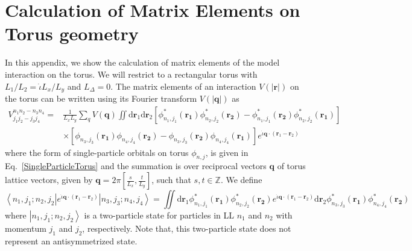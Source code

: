 \documentclass[prb,aps,epsfig,longbibliography,twocolumn]{revtex4-1}
\newcommand{\ket}[1]{\left|#1\right\rangle }
\newcommand{\bra}[1]{\left\langle #1\right|}
\newcommand{\bsym}[1]{\boldsymbol{#1}}
\newcommand{\sbkt}[1]{\left[ #1\right]}
\newcommand{\iiota}{\dot{\iota}}
\begin{document}
\section{Calculation of Matrix Elements on Torus geometry} \label{AppToruMatEle}
In this appendix, we show the calculation of matrix elements of the model interaction on the torus. We will restrict to a rectangular torus with $L_1/L_2=\iiota L_x/L_y$ and $L_\Delta=0$.  The matrix elements of an interaction $V(|\bsym{r}|)$ on the torus can be written using its Fourier transform $V(|\bsym{q}|)$  as \begin{align}
V^{n_1 n_2- n_3 n_4}_{j_1 j_2 - j_3 j_4}=&\frac{1}{L_x L_y} \sum_{{q}} V(\bsym{q}) \iint\text{d}\bsym{r}_1 \text{d}\bsym{r}_2 \sbkt{ \phi_{n_1,j_1}^{*}(\bsym{r_1}) \phi_{n_2,j_2}^{*}(\bsym{r_2})-\phi_{n_1,j_1}^{*}(\bsym{r_2}) \phi_{n_2,j_2}^{*}(\bsym{r_1})} \nonumber \\
& \times \sbkt{ \phi_{n_3,j_3}(\bsym{r_1}) \phi_{n_4,j_4}(\bsym{r_2})-  \phi_{n_3,j_3}(\bsym{r_2}) \phi_{n_4,j_4}(\bsym{r_1})} e^{{\iiota} \bsym{q}\cdot (\bsym{r}_1-\bsym{r}_2)} \label{matEleFT}
\end{align}
where the form of single-particle orbitals on torus $\phi_{n,j}$, is given in Eq.~\eqref{SingleParticleTorus} and the summation is over reciprocal vectors $\bsym{q}$ of torus lattice vectors, given by $\bsym{q}=2\pi\sbkt{\frac{s}{L_x},\frac{t}{L_y}}$, such that $s, t\in \mathbb{Z}$. We define
\begin{equation}
\bra{n_1,j_1;n_2,j_2}{e^{{\iiota} \bsym{q}\cdot (\bsym{r}_1-\bsym{r}_2)}}\ket{n_3,j_3;n_4,j_4} = \iint\text{d}\bsym{r}_1 \phi_{n_1,j_1}^{*}(\bsym{r_1}) \phi_{n_2,j_2}^{*}(\bsym{r_2})  e^{{\iiota} \bsym{q}\cdot (\bsym{r}_1-\bsym{r}_2)}  \text{d}\bsym{r}_2 \phi_{n_3,j_3}^{*}(\bsym{r_1}) \phi_{n_4,j_4}^{*}(\bsym{r_2}) \label{definition}
\end{equation}
where $\ket{n_1,j_1;n_2,j_2}$ is a two-particle state for particles in LL $n_1$ and $n_2$ with momentum $j_1$ and $j_2$, respectively. Note that, this two-particle state does not represent an antisymmetrized state.
\end{document}
